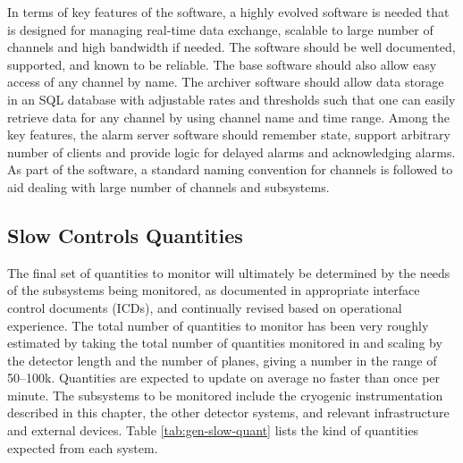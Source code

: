 In terms of key features of the software, a highly evolved software is
needed that is designed for managing real-time data exchange, scalable
to large number of channels and high bandwidth if needed. The software
should be well documented, supported, and known to be reliable. The base
software should also allow easy access of any channel by name. The
archiver software should allow data storage in an SQL database with
adjustable rates and thresholds such that one can easily retrieve data
for any channel by using channel name and time range. Among the key
features, the alarm server software should remember state, support
arbitrary number of clients and provide logic for delayed alarms and
acknowledging alarms. As part of the software, a standard naming
convention for channels is followed to aid dealing with large
number of channels and subsystems.


\subsection{Slow Controls Quantities}
\label{sec:fddp-slow-cryo-quant}


The final set of quantities to monitor will ultimately be determined
by the needs of the subsystems being monitored, as documented in
appropriate  interface control documents (ICDs), and continually revised based on operational
experience.  The total number of quantities to monitor has been very
roughly estimated by taking the total number of quantities monitored
in \microboone and scaling by the detector length and the number of
planes, giving a number in the range of \numrange{50}{100}k.
Quantities are expected to update on average no faster than once per minute.
The subsystems
to be monitored include the %
cryogenic instrumentation
described in this chapter, the other detector systems, and relevant
infrastructure and external devices. Table \ref{tab:gen-slow-quant}
lists the kind of quantities expected from each system.

